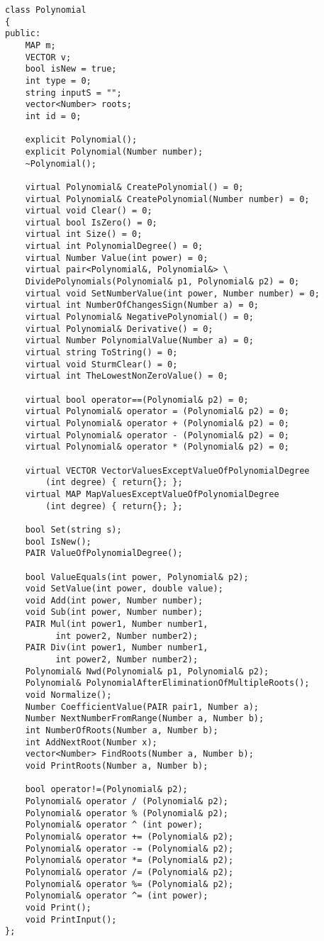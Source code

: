 \begin{lstlisting}
class Polynomial
{
public:
	MAP m;
	VECTOR v;
	bool isNew = true;
	int type = 0;
	string inputS = "";
	vector<Number> roots;
	int id = 0;
	
	explicit Polynomial();
	explicit Polynomial(Number number);
	~Polynomial();
	
	virtual Polynomial& CreatePolynomial() = 0;
	virtual Polynomial& CreatePolynomial(Number number) = 0;
	virtual void Clear() = 0;
	virtual bool IsZero() = 0;
	virtual int Size() = 0;
	virtual int PolynomialDegree() = 0;
	virtual Number Value(int power) = 0;
	virtual pair<Polynomial&, Polynomial&> \
	DividePolynomials(Polynomial& p1, Polynomial& p2) = 0;
	virtual void SetNumberValue(int power, Number number) = 0;
	virtual int NumberOfChangesSign(Number a) = 0;
	virtual Polynomial& NegativePolynomial() = 0;
	virtual Polynomial& Derivative() = 0;
	virtual Number PolynomialValue(Number a) = 0;
	virtual string ToString() = 0;
	virtual void SturmClear() = 0;
	virtual int TheLowestNonZeroValue() = 0;
	
	virtual bool operator==(Polynomial& p2) = 0;
	virtual Polynomial& operator = (Polynomial& p2) = 0;
	virtual Polynomial& operator + (Polynomial& p2) = 0;
	virtual Polynomial& operator - (Polynomial& p2) = 0;
	virtual Polynomial& operator * (Polynomial& p2) = 0;
	
	virtual VECTOR VectorValuesExceptValueOfPolynomialDegree
	    (int degree) { return{}; };
	virtual MAP MapValuesExceptValueOfPolynomialDegree
	    (int degree) { return{}; };
	
	bool Set(string s);
	bool IsNew();
	PAIR ValueOfPolynomialDegree();
	
	bool ValueEquals(int power, Polynomial& p2);
	void SetValue(int power, double value);
	void Add(int power, Number number);
	void Sub(int power, Number number);
	PAIR Mul(int power1, Number number1, 
	      int power2, Number number2);
	PAIR Div(int power1, Number number1,
	      int power2, Number number2);
	Polynomial& Nwd(Polynomial& p1, Polynomial& p2);
	Polynomial& PolynomialAfterEliminationOfMultipleRoots();
	void Normalize();
	Number CoefficientValue(PAIR pair1, Number a);
	Number NextNumberFromRange(Number a, Number b);
	int NumberOfRoots(Number a, Number b);
	int AddNextRoot(Number x);
	vector<Number> FindRoots(Number a, Number b);
	void PrintRoots(Number a, Number b);
	
	bool operator!=(Polynomial& p2);
	Polynomial& operator / (Polynomial& p2);
	Polynomial& operator % (Polynomial& p2);
	Polynomial& operator ^ (int power);
	Polynomial& operator += (Polynomial& p2);
	Polynomial& operator -= (Polynomial& p2);
	Polynomial& operator *= (Polynomial& p2);
	Polynomial& operator /= (Polynomial& p2);
	Polynomial& operator %= (Polynomial& p2);
	Polynomial& operator ^= (int power);
	void Print();
	void PrintInput();
};
\end{lstlisting}

